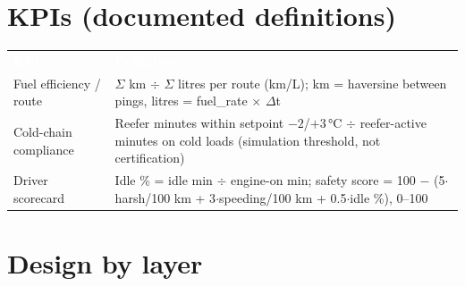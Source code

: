 \documentclass[10pt,a4paper]{article}
\newcommand{\thead}[1]{\textcolor{white}{\bfseries #1}}
\begin{document}
\section{KPIs (documented definitions)}

{\footnotesize
{}
\begin{tabularx}{\linewidth}{@{}>{\raggedright\arraybackslash}p{3.3cm}Y@{}}
\thead{KPI} & \thead{Definition} \\
Fuel efficiency / route & $\Sigma$ km $\div$ $\Sigma$ litres per route (km/L); km = haversine between pings, litres = fuel\_rate $\times$ $\Delta$t \\
Cold-chain compliance & Reefer minutes within setpoint $-2$/$+3$\,°C $\div$ reefer-active minutes on cold loads (simulation threshold, not certification) \\
Driver scorecard & Idle \% = idle min $\div$ engine-on min; safety score = 100 $-$ (5$\cdot$harsh/100 km + 3$\cdot$speeding/100 km + 0.5$\cdot$idle \%), 0--100 \\
\end{tabularx}}

\newpage
\section{Design by layer}
\end{document}
